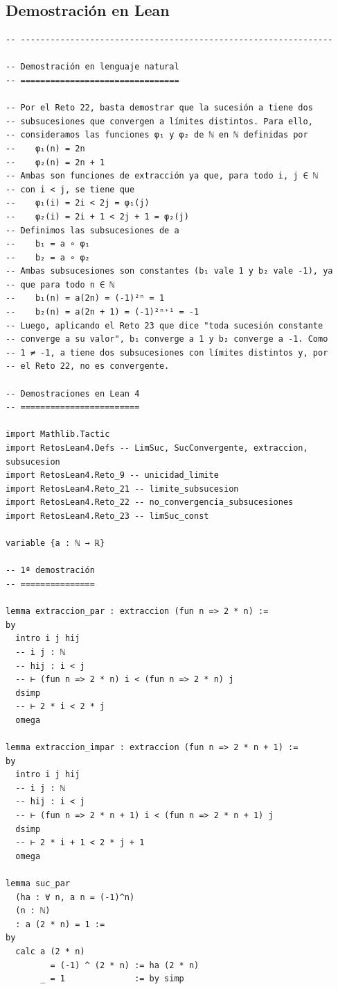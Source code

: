 \subsection{Demostración en Lean}

\begin{verbatim}
-- ---------------------------------------------------------------

-- Demostración en lenguaje natural
-- ================================

-- Por el Reto 22, basta demostrar que la sucesión a tiene dos
-- subsucesiones que convergen a límites distintos. Para ello,
-- consideramos las funciones φ₁ y φ₂ de ℕ en ℕ definidas por
--    φ₁(n) = 2n
--    φ₂(n) = 2n + 1
-- Ambas son funciones de extracción ya que, para todo i, j ∈ ℕ
-- con i < j, se tiene que
--    φ₁(i) = 2i < 2j = φ₁(j)
--    φ₂(i) = 2i + 1 < 2j + 1 = φ₂(j)
-- Definimos las subsucesiones de a
--    b₁ = a ∘ φ₁
--    b₂ = a ∘ φ₂
-- Ambas subsucesiones son constantes (b₁ vale 1 y b₂ vale -1), ya
-- que para todo n ∈ ℕ
--    b₁(n) = a(2n) = (-1)²ⁿ = 1
--    b₂(n) = a(2n + 1) = (-1)²ⁿ⁺¹ = -1
-- Luego, aplicando el Reto 23 que dice "toda sucesión constante
-- converge a su valor", b₁ converge a 1 y b₂ converge a -1. Como
-- 1 ≠ -1, a tiene dos subsucesiones con límites distintos y, por
-- el Reto 22, no es convergente.

-- Demostraciones en Lean 4
-- ========================

import Mathlib.Tactic
import RetosLean4.Defs -- LimSuc, SucConvergente, extraccion, subsucesion
import RetosLean4.Reto_9 -- unicidad_limite
import RetosLean4.Reto_21 -- limite_subsucesion
import RetosLean4.Reto_22 -- no_convergencia_subsucesiones
import RetosLean4.Reto_23 -- limSuc_const

variable {a : ℕ → ℝ}

-- 1ª demostración
-- ===============

lemma extraccion_par : extraccion (fun n => 2 * n) :=
by
  intro i j hij
  -- i j : ℕ
  -- hij : i < j
  -- ⊢ (fun n => 2 * n) i < (fun n => 2 * n) j
  dsimp
  -- ⊢ 2 * i < 2 * j
  omega

lemma extraccion_impar : extraccion (fun n => 2 * n + 1) :=
by
  intro i j hij
  -- i j : ℕ
  -- hij : i < j
  -- ⊢ (fun n => 2 * n + 1) i < (fun n => 2 * n + 1) j
  dsimp
  -- ⊢ 2 * i + 1 < 2 * j + 1
  omega

lemma suc_par
  (ha : ∀ n, a n = (-1)^n)
  (n : ℕ)
  : a (2 * n) = 1 :=
by
  calc a (2 * n)
         = (-1) ^ (2 * n) := ha (2 * n)
       _ = 1              := by simp


\end{verbatim}
